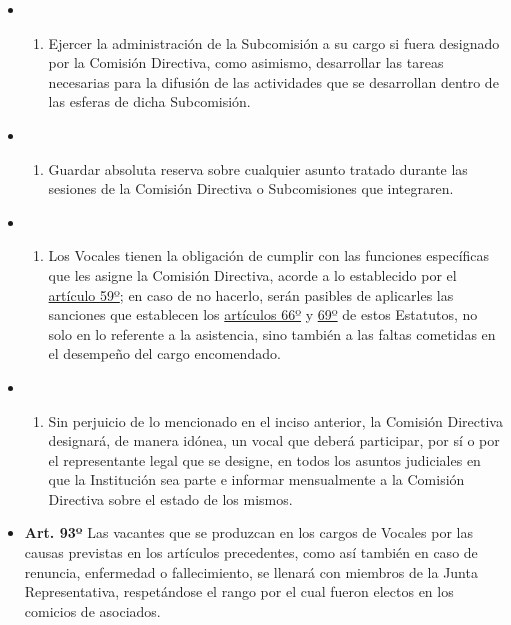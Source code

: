 \documentclass[]{book}
\providecommand{\tightlist}{%
  \setlength{\itemsep}{0pt}\setlength{\parskip}{0pt}}
\begin{document}
\begin{itemize}
\begin{itemize}
  \item
    \begin{enumerate}
    \def\labelenumi{\alph{enumi})}
    \setcounter{enumi}{5}
    \tightlist
    \item
      Ejercer la administración de la Subcomisión a su cargo si fuera designado por la Comisión Directiva, como asimismo, desarrollar las tareas necesarias para la difusión de las actividades que se desarrollan dentro de las esferas de dicha Subcomisión.
    \end{enumerate}
  \item
    \begin{enumerate}
    \def\labelenumi{\alph{enumi})}
    \setcounter{enumi}{6}
    \tightlist
    \item
      Guardar absoluta reserva sobre cualquier asunto tratado durante las sesiones de la Comisión Directiva o Subcomisiones que integraren.
    \end{enumerate}
  \item
    \begin{enumerate}
    \def\labelenumi{\alph{enumi})}
    \setcounter{enumi}{7}
    \tightlist
    \item
      Los Vocales tienen la obligación de cumplir con las funciones específicas que les asigne la Comisión Directiva, acorde a lo establecido por el \protect\hyperlink{art59}{artículo 59º}; en caso de no hacerlo, serán pasibles de aplicarles las sanciones que establecen los \protect\hyperlink{art66}{artículos 66º} y \protect\hyperlink{art69}{69º} de estos Estatutos, no solo en lo referente a la asistencia, sino también a las faltas cometidas en el desempeño del cargo encomendado.
    \end{enumerate}
  \item
    \begin{enumerate}
    \def\labelenumi{\roman{enumi})}
    \tightlist
    \item
      Sin perjuicio de lo mencionado en el inciso anterior, la Comisión Directiva designará, de manera idónea, un vocal que deberá participar, por sí o por el representante legal que se designe, en todos los asuntos judiciales en que la Institución sea parte e informar mensualmente a la Comisión Directiva sobre el estado de los mismos.
    \end{enumerate}
  \end{itemize}
\end{itemize}

\begin{itemize}
\tightlist
\item
  \textbf{Art. 93º}
  Las vacantes que se produzcan en los cargos de Vocales por las causas previstas en los artículos precedentes, como así también en caso de renuncia, enfermedad o fallecimiento, se llenará con miembros de la Junta Representativa, respetándose el rango por el cual fueron electos en los comicios de asociados.
\end{itemize}
\end{document}
